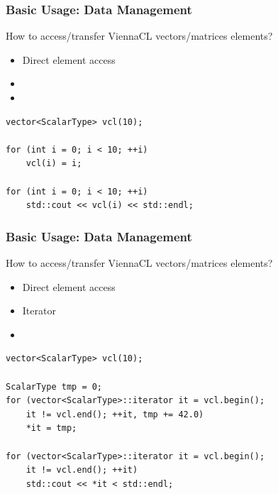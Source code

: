 \begin{frame}[fragile]
\frametitle{Basic Usage: Data Management}

\begin{block}{How to access/transfer ViennaCL vectors/matrices elements?}
  \begin{itemize}
   \item Direct element access
   \item
   \item
  \end{itemize}
  
  \begin{lstlisting}
vector<ScalarType> vcl(10);

for (int i = 0; i < 10; ++i)
    vcl(i) = i;
    
for (int i = 0; i < 10; ++i)
    std::cout << vcl(i) << std::endl;
  \end{lstlisting}
\end{block}

\vspace{1.15cm}

\end{frame}



\begin{frame}[fragile]
\frametitle{Basic Usage: Data Management}

\begin{block}{How to access/transfer ViennaCL vectors/matrices elements?}
  \begin{itemize}
   \item Direct element access
   \item Iterator
   \item
  \end{itemize}
  
  \begin{lstlisting}
vector<ScalarType> vcl(10);

ScalarType tmp = 0;
for (vector<ScalarType>::iterator it = vcl.begin();
    it != vcl.end(); ++it, tmp += 42.0)
    *it = tmp;
    
for (vector<ScalarType>::iterator it = vcl.begin();
    it != vcl.end(); ++it)
    std::cout << *it < std::endl;
  \end{lstlisting}
\end{block}

\end{frame}



